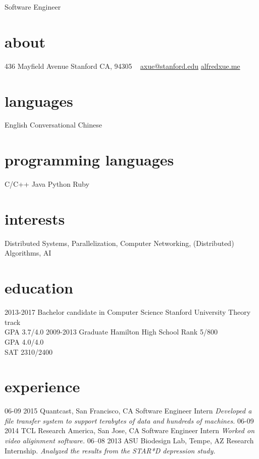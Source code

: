 \documentclass[]{friggeri-cv}
\begin{document}
       {Software Engineer}


\begin{aside}
  \section{about}
    436 Mayfield Avenue
    Stanford CA, 94305
    ~
    \href{mailto:axue@stanford.edu}{axue@stanford.edu}
    \href{alfredxue.me}{alfredxue.me}
  \section{languages}
    English
    Conversational Chinese
  \section{programming languages}
    C/C++
    Java
    Python
    Ruby
\end{aside}

\section{interests}

Distributed Systems, Parallelization, Computer Networking, (Distributed) Algorithms, AI

\section{education}
\begin{entrylist}
  \entry
    {2013-2017}
    {Bachelor {\normalfont candidate in Computer Science}}
    {Stanford University}
    {Theory track \\
     GPA 3.7/4.0}
  \entry
    {2009-2013}
    {Graduate}
    {Hamilton High School}
    {Rank 5/800 \\ 
    GPA 4.0/4.0 \\
    SAT 2310/2400}
\end{entrylist}

\section{experience}

\begin{entrylist}
  \entry
    {06-09 2015}
    {Quantcast, San Francisco, CA}
    {Software Engineer Intern}
    {\emph{Developed a file transfer system to support terabytes of data and hundreds of machines.}}
  \entry
    {06-09 2014}
    {TCL Research America, San Jose, CA}
    {Software Engineer Intern}
    {\emph{Worked on video aliginment software.}}
  \entry
    {06–08 2013}
    {ASU Biodesign Lab, Tempe, AZ}
    {Research Internship.}
    {\emph{Analyzed the results from the STAR*D depression study.}}
\end{entrylist}
\end{document}

